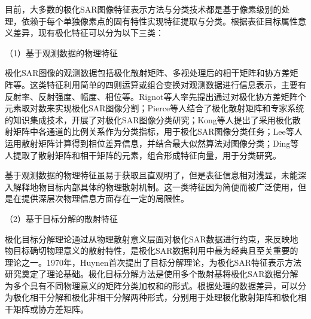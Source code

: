 目前，大多数的极化SAR图像特征表示方法与分类技术都是基于像素级别的处理，依赖于每个单独像素点的固有特性实现特征提取与分类。根据表征目标属性意义差异，现有极化特征可以分为以下三类：

（1）基于观测数据的物理特征

极化SAR图像的观测数据包括极化散射矩阵、多视处理后的相干矩阵和协方差矩阵等。这类特征利用简单的四则运算或组合变换对观测数据进行信息表示，主要有反射率、反射强度、幅度、相位等。Rignot等人率先提出通过对极化协方差矩阵个元素取对数来实现极化SAR图像分割；Pierce等人结合了极化散射矩阵和专家系统的知识集成技术，开展了对极化SAR图像分类研究；Kong等人提出了采用极化散射矩阵中各通道的比例关系作为分类指标，用于极化SAR图像分类任务；Lee等人运用散射矩阵计算得到相位差异信息，并结合最大似然算法对图像分类；Ding等人提取了散射矩阵和相干矩阵的元素，组合形成特征向量，用于分类研究。

基于观测数据的物理特征虽易于获取且直观明了，但是表征信息相对浅显，未能深入解释地物目标内部具体的物理散射机制。这一类特征因为简便而被广泛使用，但是在提供深层次物理信息方面存在一定的局限性。


（2）基于目标分解的散射特征

极化目标分解理论通过从物理散射意义层面对极化SAR数据进行约束，来反映地物目标确切物理意义的散射特性，是极化SAR数据利用中最为经典且至关重要的理论之一。1970年，Huynen首次提出了目标分解理论，为极化SAR特征表示方法研究奠定了理论基础。极化目标分解方法是使用多个散射基将极化SAR数据分解为多个具有不同物理意义的矩阵分类加权和的形式。根据处理的数据差异，可以分为极化相干分解和极化非相干分解两种形式，分别用于处理极化散射矩阵和极化相干矩阵或协方差矩阵。

